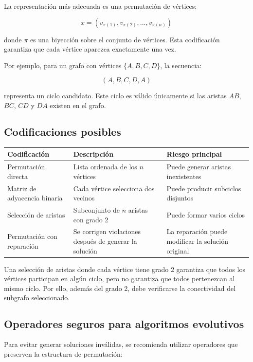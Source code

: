 \documentclass[12pt]{article}
\begin{document}
La representación más adecuada es una permutación de vértices:

\[
x=(v_{\pi(1)},v_{\pi(2)},\dots,v_{\pi(n)})
\]

donde \(\pi\) es una biyección sobre el conjunto de vértices. Esta codificación garantiza que cada vértice aparezca exactamente una vez.

Por ejemplo, para un grafo con vértices \(\{A,B,C,D\}\), la secuencia:

\[
(A,B,C,D,A)
\]

representa un ciclo candidato. Este ciclo es válido únicamente si las aristas \(AB\), \(BC\), \(CD\) y \(DA\) existen en el grafo.

\subsection{Codificaciones posibles}

\begin{table}[h]
\centering
\begin{tabular}{lll}
\toprule
\textbf{Codificación} & \textbf{Descripción} & \textbf{Riesgo principal} \\
\midrule
Permutación directa & Lista ordenada de los \(n\) vértices & Puede generar aristas inexistentes \\
Matriz de adyacencia binaria & Cada vértice selecciona dos vecinos & Puede producir subciclos disjuntos \\
Selección de aristas & Subconjunto de \(n\) aristas con grado 2 & Puede formar varios ciclos \\
Permutación con reparación & Se corrigen violaciones después de generar la solución & La reparación puede modificar la solución original \\
\bottomrule
\end{tabular}
\end{table}

Una selección de aristas donde cada vértice tiene grado 2 garantiza que todos los vértices participan en algún ciclo, pero no garantiza que todos pertenezcan al mismo ciclo. Por ello, además del grado 2, debe verificarse la conectividad del subgrafo seleccionado. \cite{fhcp}

\subsection{Operadores seguros para algoritmos evolutivos}

Para evitar generar soluciones inválidas, se recomienda utilizar operadores que preserven la estructura de permutación:
\end{document}
